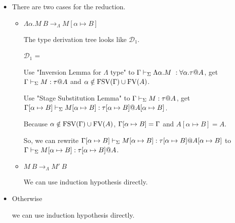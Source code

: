\begin{itemize}
	\newcommand{\R}{\longrightarrow_{\Lambda}}
	\item \TIns
	      	      
	      There are two cases for the reduction.
	      \begin{itemize}
	      	\item $\Lambda\alpha.M\ B \R M[\alpha \mapsto B]$
	      	      	      	      
	      	      The type derivation tree looks like $\mathcal{D}_1$.
	      	      	      	      
	      	      $\mathcal{D}_1$ = 
	      	      {}
	      	      	      	      
	      	      Use "Inversion Lemma for $\Lambda$ type" to $\Gamma \vdash_\Sigma \Lambda\alpha.M\ : \forall\alpha.\tau @ A$,
	      	      get $\Gamma \vdash_\Sigma M : \tau @ A$ and $\alpha \notin \text{FSV}(\Gamma) \cup \text{FV}(A)$.
	      	      	      	      
	      	      Use "Stage Substitution Lemma" to $\Gamma \vdash_\Sigma M : \tau @ A$,
	      	      get $\Gamma[\alpha \mapsto B] \vdash_\Sigma M[\alpha \mapsto B] : \tau[\alpha \mapsto B] @ A[\alpha \mapsto B]$.
	      	      	      	      
	      	      Because $\alpha \notin \text{FSV}(\Gamma) \cup \text{FV}(A)$, $\Gamma[\alpha \mapsto B] = \Gamma$ and $A[\alpha \mapsto B] = A$.
	      	      	      	      
	      	      So, we can rewrite $\Gamma[\alpha \mapsto B] \vdash_\Sigma M[\alpha \mapsto B] : \tau[\alpha \mapsto B] @ A[\alpha \mapsto B]$ to
	      	      $\Gamma \vdash_\Sigma M[\alpha \mapsto B] : \tau[\alpha \mapsto B] @ A$.
	      	\item $M\ B \R M'\ B$
	      	      	      	      
	      	      We can use induction hypothesis directly.
	      \end{itemize}
	      	      
	\item Otherwise
	      	      
	      we can use induction hypothesis directly.
\end{itemize}

